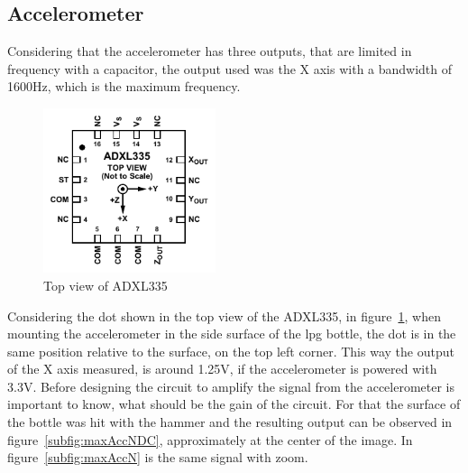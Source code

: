 \subsection{Accelerometer}
Considering that the accelerometer has three outputs, that are limited in frequency with a capacitor, the output used was the X axis with a bandwidth of 1600Hz, which is the maximum frequency.
\begin{figure}[]
    \centering
    \includegraphics[width=0.45\textwidth]{Chapters/4CHP/Figures/accTopView.pdf}
    \caption{Top view of ADXL335}
    \label{fig:topViewADXL}
\end{figure}

Considering the dot shown in the top view of the ADXL335, in figure~\ref{fig:topViewADXL}, when mounting the accelerometer in the side surface of the \acrshort{lpg} bottle, the dot is in the same position relative to the surface, on the top left corner. This way the output of the X axis measured, is around 1.25V, if the accelerometer is powered with 3.3V. Before designing the circuit to amplify the signal from the accelerometer is important to know, what should be the gain of the circuit. For that the surface of the bottle was hit with the hammer and the resulting output can be observed in figure~\ref{subfig:maxAccNDC}, approximately at the center of the image. In figure~\ref{subfig:maxAccN} is the same signal with zoom.


